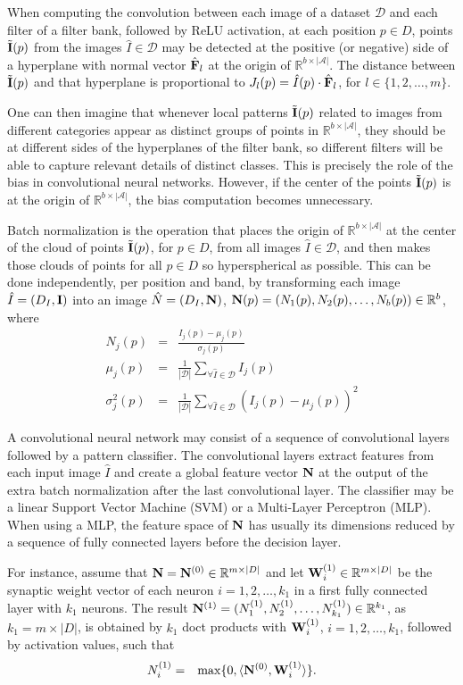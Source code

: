 \documentclass[10pt,twocolumn,letterpaper]{article}
\newcommand{\R}{\mathbb{R}}
\newcommand{\A}{\mathcal{A}}
\newcommand{\D}{\mathcal{D}}
\newcommand{\I}{\hat{I}}
\newcommand{\m}[1]{{\mathrm{\bf #1}}}
\newcommand{\E}{\tilde{\m{I}}}
\newcommand{\lI}{\m{I}}
\newcommand{\mF}{\m{F}}
\newcommand{\eF}{\hat{\mF}}
\newcommand{\gN}{\m{N}}
\newcommand{\W}{\m{W}}
\begin{document}
When computing the convolution between each image of a dataset $\D$ and each filter of a filter bank, followed by ReLU activation,
at each position $p\in D$, points $\E(p)$ from the
images $\I \in \D$ may be detected at the positive (or
negative) side of a hyperplane with normal vector $\eF_l$ at the origin of $\R^{b \times |\A|}$. The distance
between $\E(p)$ and that hyperplane is proportional to $J_l(p)
=\I(p) \cdot \eF_l$, for $l \in
\{1,2,\ldots,m\}$.

One can then imagine that whenever local patterns $\E(p)$ related to images from different categories appear as
distinct groups of points in $\R^{b\times |\A|}$, they should
be at different sides of the hyperplanes of the filter bank, so
different filters will be able to capture relevant details of distinct
classes. This is precisely the role of the bias in convolutional
neural networks. However, if the center of the points $\E(p)$ is at the origin of $\R^{b\times |\A|}$, the bias
computation becomes unnecessary.

Batch normalization is the operation that places the origin of
$\R^{b\times |\A|}$ at the center of the cloud of points
$\E(p)$, for $p\in D$, from all images $\hat{I}\in
\D$, and then makes those clouds of points for all $p\in D$ so
hyperspherical as possible. This can be done independently, per
position and band, by transforming each image $\I=(D_I,\lI)$
into an image $\hat{N}=(D_I,{\bf N})$, ${\bf
  N}(p)=(N_1(p),N_2(p),\ldots,N_b(p))\in \R^b$, where
\begin{eqnarray}
  N_j(p) & = & \frac{I_j(p) - \mu_j(p)}{\sigma_j(p)} \\
  \mu_j(p) & = & \frac{1}{|\D|} \sum_{\forall \hat{I}\in \D} I_{j}(p) \\
  \sigma^2_j(p) & = & \frac{1}{|\D|} \sum_{\forall \hat{I}\in \D} \left(I_{j}(p)-\mu_j(p)\right)^2
\end{eqnarray}

A convolutional neural network may consist of a sequence of
convolutional layers followed by a pattern classifier. The
convolutional layers extract features from each input image $\I$
and create a global feature vector $\gN$ at the output of the
extra batch normalization after the last convolutional layer. The
classifier may be a linear Support Vector Machine (SVM) or a
Multi-Layer Perceptron (MLP). When using a MLP, the feature space of $\gN$ has usually
its dimensions reduced by a sequence of fully connected layers before
the decision layer.

For instance, assume that ${\gN}={\gN}^{(0)}\in \R^{m\times |D|}$
and let ${\W}^{(1)}_i \in \R^{m\times |D|}$ be the synaptic weight
vector of each neuron $i=1,2,\ldots,k_1$ in a first fully connected
layer with $k_1$ neurons. The result ${\gN}^{(1)}=(N^{(1)}_1,N^{(1)}_2,\ldots,N^{(1)}_{k_1})\in \R^{k_1}$, as
$k_1 = m\times |D|$, is obtained by $k_1$ doct products with ${\W}^{(1)}_i$, $i=1,2,\ldots,k_1$, followed by activation values, such that
\begin{eqnarray}
  N^{(1)}_i & = & \max\{0,\langle {\gN}^{(0)}, {\W}^{(1)}_i\rangle\}.
\end{eqnarray}
\end{document}

